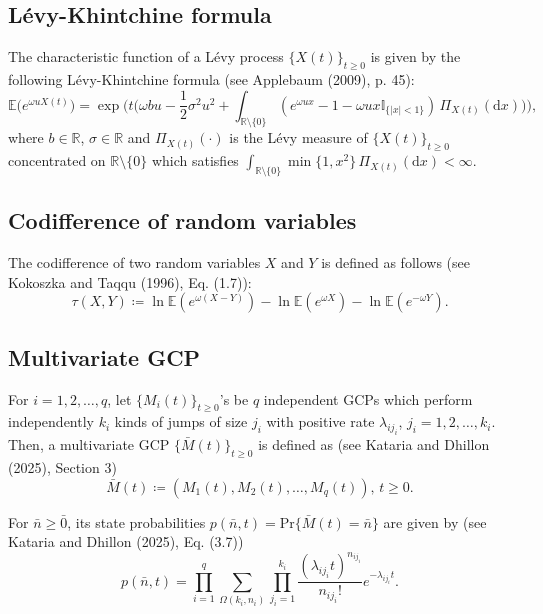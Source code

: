 \documentclass[12pt,oneside,reqno]{amsart}
\numberwithin{equation}{section}
\theoremstyle{definition}
\numberwithin{equation}{section}
\theoremstyle{remarkstyle}
\begin{document}
\subsection{L\'evy-Khintchine formula}
The characteristic function of a L\'evy process $\{X(t)\}_{t\ge 0}$ is given by the following L\'evy-Khintchine formula (see Applebaum (2009), p. 45):
\begin{equation}\label{Lev-Khint}
	\mathbb{E}\big(e^{\omega u X(t)}\big)=\exp\Big(t\Big(\omega b u-\frac{1}{2}\sigma^2 u^2+\int_{\mathbb{R}\setminus\{0\}}(e^{\omega ux}-1-\omega ux \mathbb{I}_{\{|x|<1\}})\,\Pi_{X(t)}(\mathrm{d}x)\Big)\Big),
\end{equation}
where $b\in\mathbb{R}$, $\sigma\in\mathbb{R}$ and $\Pi_{X(t)}(\cdot)$ is the L\'evy measure of $\{X(t)\}_{t\ge 0}$ concentrated on $\mathbb{R}\setminus\{0\}$ which satisfies $\int_{\mathbb{R}\setminus\{0\}}\min\{1,x^2\}\,\Pi_{X(t)}(\mathrm{d}x)<\infty$.
\subsection{Codifference of random variables} The codifference of two random variables $X$ and $Y$ is defined as follows (see Kokoszka and Taqqu (1996), Eq. (1.7)):
\begin{equation}\label{codiff}
\tau(X,Y)\coloneq\ln\mathbb{E}(e^{\omega(X-Y)})-\ln\mathbb{E}(e^{\omega X})-\ln\mathbb{E}(e^{-\omega Y}).
\end{equation}

\subsection{Multivariate GCP}
For $i=1,2,\dots,q$, let $\{M_i(t)\}_{t\ge0}$'s be $q$ independent GCPs which perform independently $k_i$ kinds of jumps of size $j_i$ with positive rate $\lambda_{ij_i}$, $j_i=1, 2, \dots, k_i$. Then, a multivariate GCP $\{\bar{M}(t)\}_{t\ge0}$ is defined as (see Kataria and Dhillon (2025), Section 3)
\begin{equation*}\label{mvgcp}
\bar{M}(t)\coloneqq (M_1(t), M_2(t),\dots,M_q(t)),\, t\ge0. 
\end{equation*}

For $\bar{n}\geq \bar{0}$, its state probabilities $p(\bar{n},t)=\mathrm{Pr}\{\bar{M}(t)=\bar{n}\}$ are given by (see Kataria and Dhillon (2025), Eq. (3.7))
\begin{equation}\label{jopmfgcp}
p(\bar{n},t)=\prod_{i=1}^{q}\sum_{\Omega(k_i,n_i)}\prod_{j_i=1}^{k_i}\frac{(\lambda_{ij_i}t)^{n_{ij_i}}}{n_{ij_i}!}e^{-\lambda_{ij_i} t}.
\end{equation}
 
\end{document}
